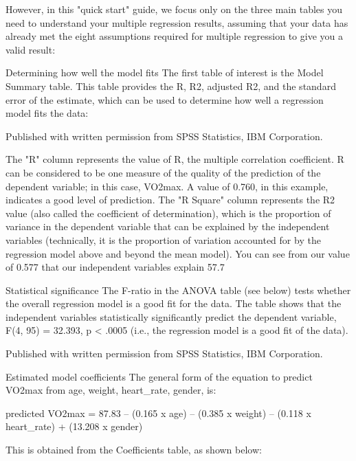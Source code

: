 \documentclass[]{article}
\begin{document}
	However, in this "quick start" guide, we focus only on the three main tables you need to understand your multiple regression results, assuming that your data has already met the eight assumptions required for multiple regression to give you a valid result:
	
	Determining how well the model fits
	The first table of interest is the Model Summary table. This table provides the R, R2, adjusted R2, and the standard error of the estimate, which can be used to determine how well a regression model fits the data:
	
	
	Published with written permission from SPSS Statistics, IBM Corporation.
	
	The "R" column represents the value of R, the multiple correlation coefficient. R can be considered to be one measure of the quality of the prediction of the dependent variable; in this case, VO2max. A value of 0.760, in this example, indicates a good level of prediction. The "R Square" column represents the R2 value (also called the coefficient of determination), which is the proportion of variance in the dependent variable that can be explained by the independent variables (technically, it is the proportion of variation accounted for by the regression model above and beyond the mean model). You can see from our value of 0.577 that our independent variables explain 57.7%
	
	Statistical significance
	The F-ratio in the ANOVA table (see below) tests whether the overall regression model is a good fit for the data. The table shows that the independent variables statistically significantly predict the dependent variable, F(4, 95) = 32.393, p < .0005 (i.e., the regression model is a good fit of the data).
	
	
	Published with written permission from SPSS Statistics, IBM Corporation.
	
	
	Estimated model coefficients
	The general form of the equation to predict VO2max from age, weight, heart\_rate, gender, is:
	
	predicted VO2max = 87.83 – (0.165 x age) – (0.385 x weight) – (0.118 x heart\_rate) + (13.208 x gender)
	
	This is obtained from the Coefficients table, as shown below:
	
\end{document}

